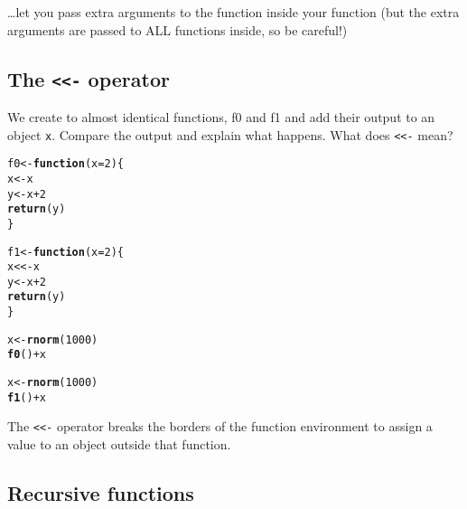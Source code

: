 \documentclass[12pt,a4paper]{scrartcl}\usepackage[]{graphicx}\usepackage[]{color}
\makeatletter
\newcommand{\hlnum}[1]{\textcolor[rgb]{0.686,0.059,0.569}{#1}}%
\newcommand{\hlopt}[1]{\textcolor[rgb]{0,0,0}{#1}}%
\newcommand{\hlstd}[1]{\textcolor[rgb]{0.345,0.345,0.345}{#1}}%
\newcommand{\hlkwa}[1]{\textcolor[rgb]{0.161,0.373,0.58}{\textbf{#1}}}%
\newcommand{\hlkwb}[1]{\textcolor[rgb]{0.69,0.353,0.396}{#1}}%
\newcommand{\hlkwc}[1]{\textcolor[rgb]{0.333,0.667,0.333}{#1}}%
\newcommand{\hlkwd}[1]{\textcolor[rgb]{0.737,0.353,0.396}{\textbf{#1}}}%
\newenvironment{kframe}{%
 \def\at@end@of@kframe{}%
 \ifinner\ifhmode%
  \def\at@end@of@kframe{\end{minipage}}%
  \begin{minipage}{\columnwidth}%
 \fi\fi%
 \def\FrameCommand##1{\hskip\@totalleftmargin \hskip-\fboxsep
 \colorbox{shadecolor}{##1}\hskip-\fboxsep
     \hskip-\linewidth \hskip-\@totalleftmargin \hskip\columnwidth}%
 \MakeFramed {\advance\hsize-\width
   \@totalleftmargin\z@ \linewidth\hsize
   \@setminipage}}%
 {\par\unskip\endMakeFramed%
 \at@end@of@kframe}
\newenvironment{knitrout}{}{} %
\makeatother
\begin{document}
\begin{Answer}
\dots let you pass extra arguments to the function inside your function (but the extra arguments are passed to ALL functions inside, so be careful!)
\end{Answer}

\subsection{The \texttt{<<-} operator}

\begin{Exercise}[difficulty=1, title={Understand the \texttt{<<-}}]
We create to almost identical functions, f0 and f1 and add their output to an object \texttt{x}. Compare the output and explain what happens. What does \texttt{<<-} mean?

\begin{knitrout}
\color{fgcolor}\begin{kframe}
\begin{alltt}
\hlstd{f0} \hlkwb{<-} \hlkwa{function}\hlstd{(}\hlkwc{x}\hlstd{=}\hlnum{2}\hlstd{)\{}
  \hlstd{x} \hlkwb{<-} \hlstd{x}
  \hlstd{y} \hlkwb{<-} \hlstd{x}\hlopt{+}\hlnum{2}
  \hlkwd{return}\hlstd{(y)}
\hlstd{\}}

\hlstd{f1} \hlkwb{<-} \hlkwa{function}\hlstd{(}\hlkwc{x}\hlstd{=}\hlnum{2}\hlstd{)\{}
  \hlstd{x} \hlkwb{<<-} \hlstd{x}
  \hlstd{y} \hlkwb{<-} \hlstd{x}\hlopt{+}\hlnum{2}
  \hlkwd{return}\hlstd{(y)}
\hlstd{\}}

\hlstd{x} \hlkwb{<-} \hlkwd{rnorm}\hlstd{(}\hlnum{1000}\hlstd{)}
\hlkwd{f0}\hlstd{()}\hlopt{+}\hlstd{x}

\hlstd{x} \hlkwb{<-} \hlkwd{rnorm}\hlstd{(}\hlnum{1000}\hlstd{)}
\hlkwd{f1}\hlstd{()}\hlopt{+}\hlstd{x}
\end{alltt}
\end{kframe}
\end{knitrout}

\end{Exercise}

\begin{Answer}
The \texttt{<<-} operator breaks the borders of the function environment to assign a value to an object outside that function.
\end{Answer}


\subsection{Recursive functions}
\end{document}
